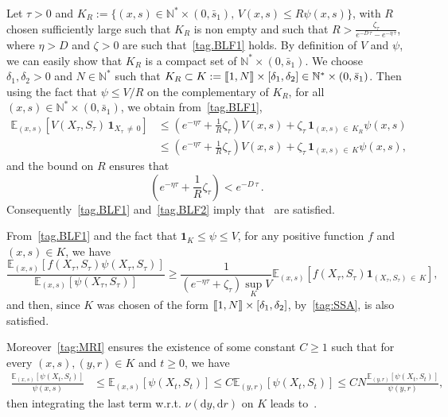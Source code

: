 \documentclass[AHL,Unicode,longabstracts,published]{cedram}
\newcommand{\llbracket}{\mathopen{[\mkern -2.7mu[}}
\newcommand{\rrbracket}{\mathclose{]\mkern -2.7mu]}}
\newcommand{\NN}{\mathbb{N}}
\newcommand{\EE}{\mathbb{E}}
\newcommand{\X}{\NN^* \times (0,\bar s_1)}
\newcommand{\dif}{\mathrm{d}}
\newcommand{\1}{\mathbf{1}}
\begin{document}
Let $\tau>0$ and $K_R:=\{(x,s)\in \X, \, V(x,s)\leq R \psi(x,s) \}$, with $R$ chosen sufficiently large such that $K_R$ is non empty and such that $R>\frac{\zeta_\tau}{e^{-D\,\tau}-e^{-\eta\,\tau}}$, where $\eta>D$ and $\zeta>0$ are such that~\eqref{tag.BLF1} holds. By definition of $V$ and $\psi$, we can easily show that $K_R$ is a compact set of $\X$. We choose $\delta_1,\delta_2>0$ and $N \in \NN^*$ such that $K_R\subset K:=\llbracket 1,N\rrbracket\times [\delta_1,\delta_2]\in \X$. Then using the fact that $\psi \leq V/R$ on the complementary of $K_R$, for all $(x,s)\in \X$, we obtain from~\eqref{tag.BLF1},
\begin{align*}
\EE_{(x,s)}\left[V(X_\tau,S_\tau)\,\1_{X_\tau\,\neq\,0}\right] & \leq \left(e^{-\eta \tau} + \frac{1}{R} \zeta_\tau \right) V(x,s)+ \zeta_\tau \,\1_{(x,s)\,\in\,K_R} \psi(x,s)\\
& \leq \left(e^{-\eta \tau} + \frac{1}{R} \zeta_\tau \right) V(x,s)+ \zeta_\tau \, \1_{(x,s)\,\in\,K} \psi(x,s),
\end{align*}
and the bound on $R$ ensures that
\[
\left(e^{-\eta \tau} + \frac{1}{R} \zeta_\tau \right)<e^{-D\,\tau}\,.
\]
Consequently~\eqref{tag.BLF1} and~\eqref{tag.BLF2} imply that~\cite[Assumptions~(A1) and (A2)]{BCGM} are satisfied.

From~\eqref{tag.BLF1} and the fact that $\1_K \leq \psi\leq V$, for any positive function $f$ and $(x,s) \in K$, we have
\[
\frac{\EE_{(x,s)}\left[f\left(X_\tau, S_\tau\right) \psi\left(X_\tau, S_\tau\right) \right]}{\EE_{(x,s)}\left[\psi\left(X_\tau, S_\tau\right)\right]} \geq \frac{1 }{\left(e^{-\eta \tau } +\zeta_\tau\right) \sup_K V} \EE_{(x,s)}\left[f(X_\tau, S_\tau) \1_{(X_\tau, S_\tau)\,\in\,K} \right],
\]
and then, since $K$ was chosen of the form $\llbracket 1,N\rrbracket\times [\delta_1,\delta_2]$, by~\eqref{tag:SSA}, \cite[Assumption~(A3)]{BCGM} is also satisfied.

Moreover~\eqref{tag:MRI} ensures the existence of some constant $C\geq 1$ such that for every $(x,s), (y,r) \in K$ and $t\geq 0$, we have
\begin{align*}
\frac{\EE_{(x,s)}\left[\psi(X_t, S_t) \right]}{\psi(x,s)} &\leq \EE_{(x,s)}\left[\psi(X_t, S_t) \right]
\leq C \EE_{(y,r)}\left[\psi(X_t, S_t) \right] \leq CN \frac{\EE_{(y,r)}\left[\psi(X_t, S_t) \right]}{\psi(y,r)},
\end{align*}
then integrating the last term w.r.t. $\nu(\dif y,\dif r)$ on $K$ leads to~\cite[Assumption~(A4)]{BCGM}.
\end{document}
